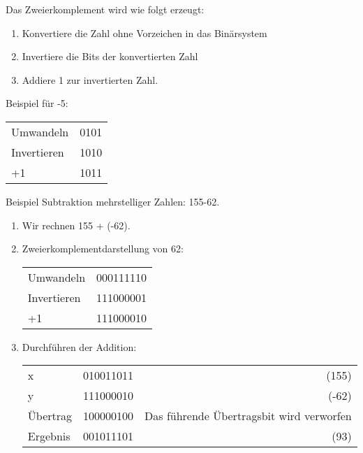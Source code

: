 \begin{bsslide}[\textbufferB]
  Das Zweierkomplement wird wie folgt erzeugt:
  \begin{enumerate}
  \item Konvertiere die Zahl ohne Vorzeichen in das Bin\"arsystem
  \item Invertiere die Bits der konvertierten Zahl
  \item Addiere 1 zur invertierten Zahl.
  \end{enumerate}
  Beispiel f\"ur -5:
  \begin{center}
    \begin{tabular}{lr}
      {Umwandeln} & 0101     \\
      {Invertieren} &  1010 \\
      {+1} & 1011 \\    
    \end{tabular}
  \end{center}
\end{bsslide}
\begin{bsslide}[\textbufferB]
  Beispiel Subtraktion mehrstelliger Zahlen: 155-62.
  \begin {enumerate}
  \item Wir rechnen 155 + (-62).
  \item     Zweierkomplementdarstellung von 62:
    \begin{center}
      \begin{tabular}{lr}
        {Umwandeln} & 000111110     \\
        {Invertieren} &  111000001 \\
        {+1} &              111000010 \\
      \end{tabular}
    \end{center}
  \item Durchf\"uhren der Addition:
    \begin{center}
      \begin{tabular}{lrr}
        {x} &                010011011 & (155) \\
        {y} &                111000010 & (-62)\\
        {\"Ubertrag} & 100000100& {Das f\"uhrende \"Ubertragsbit wird verworfen}\\
        \hline
        {Ergebnis} &    001011101&  (93)\\   
      \end{tabular}
    \end{center}
  \end {enumerate}
\end{bsslide}



